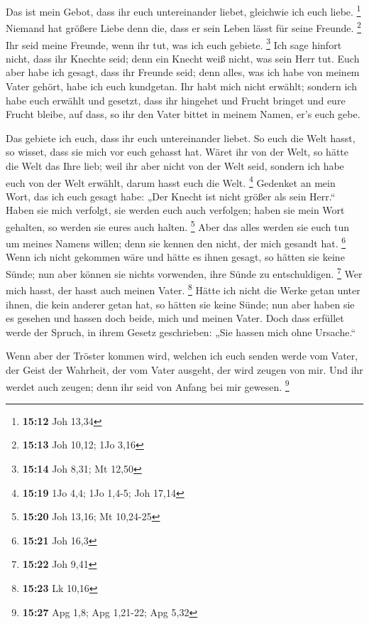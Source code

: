  Das ist mein Gebot, dass ihr euch untereinander liebet,
gleichwie ich euch liebe. \footnote{\textbf{15:12} Joh 13,34}
 Niemand hat größere Liebe denn die, dass er sein Leben
lässt für seine Freunde. \footnote{\textbf{15:13} Joh 10,12; 1Jo 3,16}
 Ihr seid meine Freunde, wenn ihr tut, was ich euch
gebiete. \footnote{\textbf{15:14} Joh 8,31; Mt 12,50}  Ich
sage hinfort nicht, dass ihr Knechte seid; denn ein Knecht weiß nicht,
was sein Herr tut. Euch aber habe ich gesagt, dass ihr Freunde seid;
denn alles, was ich habe von meinem Vater gehört, habe ich euch
kundgetan.  Ihr habt mich nicht erwählt; sondern ich habe
euch erwählt und gesetzt, dass ihr hingehet und Frucht bringet und eure
Frucht bleibe, auf dass, so ihr den Vater bittet in meinem Namen, er's
euch gebe.

 Das gebiete ich euch, dass ihr euch untereinander liebet.
 So euch die Welt hasst, so wisset, dass sie mich vor euch
gehasst hat.  Wäret ihr von der Welt, so hätte die Welt das
Ihre lieb; weil ihr aber nicht von der Welt seid, sondern ich habe euch
von der Welt erwählt, darum hasst euch die Welt. \footnote{\textbf{15:19}
  1Jo 4,4; 1Jo 1,4-5; Joh 17,14}  Gedenket an mein Wort,
das ich euch gesagt habe: „Der Knecht ist nicht größer als sein Herr.``
Haben sie mich verfolgt, sie werden euch auch verfolgen; haben sie mein
Wort gehalten, so werden sie eures auch halten. \footnote{\textbf{15:20}
  Joh 13,16; Mt 10,24-25}  Aber das alles werden sie euch
tun um meines Namens willen; denn sie kennen den nicht, der mich gesandt
hat. \footnote{\textbf{15:21} Joh 16,3}  Wenn ich nicht
gekommen wäre und hätte es ihnen gesagt, so hätten sie keine Sünde; nun
aber können sie nichts vorwenden, ihre Sünde zu entschuldigen.
\footnote{\textbf{15:22} Joh 9,41}  Wer mich hasst, der
hasst auch meinen Vater. \footnote{\textbf{15:23} Lk 10,16}
 Hätte ich nicht die Werke getan unter ihnen, die kein
anderer getan hat, so hätten sie keine Sünde; nun aber haben sie es
gesehen und hassen doch beide, mich und meinen Vater.  Doch
dass erfüllet werde der Spruch, in ihrem Gesetz geschrieben: „Sie hassen
mich ohne Ursache.``

 Wenn aber der Tröster kommen wird, welchen ich euch senden
werde vom Vater, der Geist der Wahrheit, der vom Vater ausgeht, der wird
zeugen von mir.  Und ihr werdet auch zeugen; denn ihr seid
von Anfang bei mir gewesen. \footnote{\textbf{15:27} Apg 1,8; Apg
  1,21-22; Apg 5,32}

